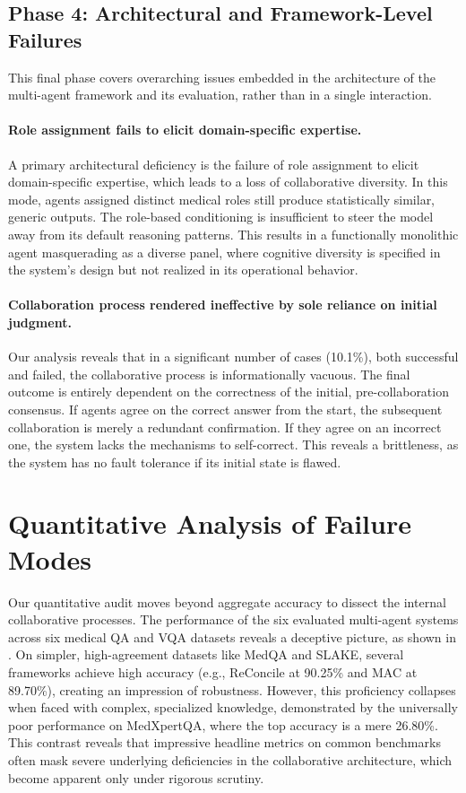\subsection{Phase 4: Architectural and Framework-Level Failures}
This final phase covers overarching issues embedded in the architecture of the multi-agent framework and its evaluation, rather than in a single interaction.

\paragraph{Role assignment fails to elicit domain-specific expertise.}
A primary architectural deficiency is the failure of role assignment to elicit domain-specific expertise, which leads to a loss of collaborative diversity. In this mode, agents assigned distinct medical roles still produce statistically similar, generic outputs. The role-based conditioning is insufficient to steer the model away from its default reasoning patterns. This results in a functionally monolithic agent masquerading as a diverse panel, where cognitive diversity is specified in the system's design but not realized in its operational behavior.

\paragraph{Collaboration process rendered ineffective by sole reliance on initial judgment.}
Our analysis reveals that in a significant number of cases (10.1\%), both successful and failed, the collaborative process is informationally vacuous. The final outcome is entirely dependent on the correctness of the initial, pre-collaboration consensus. If agents agree on the correct answer from the start, the subsequent collaboration is merely a redundant confirmation. If they agree on an incorrect one, the system lacks the mechanisms to self-correct. This reveals a brittleness, as the system has no fault tolerance if its initial state is flawed.

\section{Quantitative Analysis of Failure Modes}
Our quantitative audit moves beyond aggregate accuracy to dissect the internal collaborative processes. The performance of the six evaluated multi-agent systems across six medical QA and VQA datasets reveals a deceptive picture, as shown in . On simpler, high-agreement datasets like MedQA and SLAKE, several frameworks achieve high accuracy (e.g., ReConcile at 90.25\% and MAC at 89.70\%), creating an impression of robustness. However, this proficiency collapses when faced with complex, specialized knowledge, demonstrated by the universally poor performance on MedXpertQA, where the top accuracy is a mere 26.80\%. This contrast reveals that impressive headline metrics on common benchmarks often mask severe underlying deficiencies in the collaborative architecture, which become apparent only under rigorous scrutiny.


